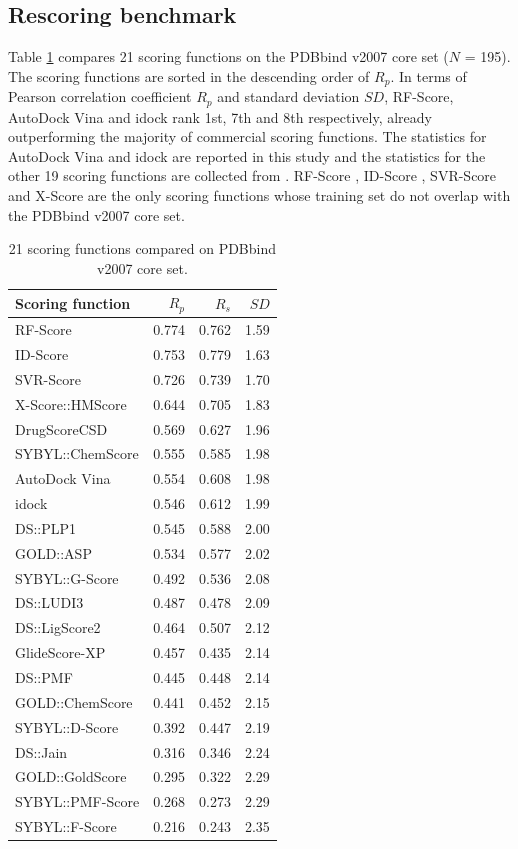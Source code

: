\subsection{Rescoring benchmark}

Table \ref{istar:ScoringFunctionComparison} compares 21 scoring functions on the PDBbind v2007 core set ($N$ = 195). The scoring functions are sorted in the descending order of $R_p$. In terms of Pearson correlation coefficient $R_p$ and standard deviation $SD$, RF-Score, AutoDock Vina and idock rank 1st, 7th and 8th respectively, already outperforming the majority of commercial scoring functions. The statistics for AutoDock Vina and idock are reported in this study and the statistics for the other 19 scoring functions are collected from \citep{1313,564,1305,1295}. RF-Score \citep{564}, ID-Score \citep{1305}, SVR-Score \citep{1295} and X-Score \citep{573} are the only scoring functions whose training set do not overlap with the PDBbind v2007 core set.

\begin{table}
\caption{21 scoring functions compared on PDBbind v2007 core set.}
\label{istar:ScoringFunctionComparison}
\begin{tabular}{lrrr}
\hline
Scoring function & $R_p$ & $R_s$ & $SD$\\
\hline
RF-Score & 0.774 & 0.762 & 1.59\\
ID-Score & 0.753 & 0.779 & 1.63\\
SVR-Score & 0.726 & 0.739 & 1.70\\
X-Score::HMScore & 0.644 & 0.705 & 1.83\\
DrugScoreCSD & 0.569 & 0.627 & 1.96\\
SYBYL::ChemScore & 0.555 & 0.585 & 1.98\\
AutoDock Vina & 0.554 & 0.608 & 1.98\\
idock & 0.546 & 0.612 & 1.99\\
DS::PLP1 & 0.545 & 0.588 & 2.00\\
GOLD::ASP & 0.534 & 0.577 & 2.02\\
SYBYL::G-Score & 0.492 & 0.536 & 2.08\\
DS::LUDI3 & 0.487 & 0.478 & 2.09\\
DS::LigScore2 & 0.464 & 0.507 & 2.12\\
GlideScore-XP & 0.457 & 0.435 & 2.14\\
DS::PMF & 0.445 & 0.448 & 2.14\\
GOLD::ChemScore & 0.441 & 0.452 & 2.15\\
SYBYL::D-Score & 0.392 & 0.447 & 2.19\\
DS::Jain & 0.316 & 0.346 & 2.24\\
GOLD::GoldScore & 0.295 & 0.322 & 2.29\\
SYBYL::PMF-Score & 0.268 & 0.273 & 2.29\\
SYBYL::F-Score & 0.216 & 0.243 & 2.35\\
\hline
\end{tabular}
\end{table}

